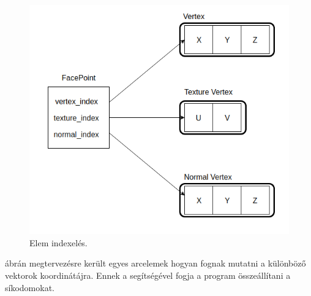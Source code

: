 \bigskip
\begin{figure}[h]
\centering
\includegraphics[scale=0.5]{images/point.png}
\caption{Elem indexelés.}
\label{fig:index_}
\end{figure}
\bigskip

 ábrán megtervezésre került egyes arcelemek hogyan fognak mutatni a különböző vektorok koordinátájra. Ennek a segítségével fogja a program összeállítani a síkodomokat.



